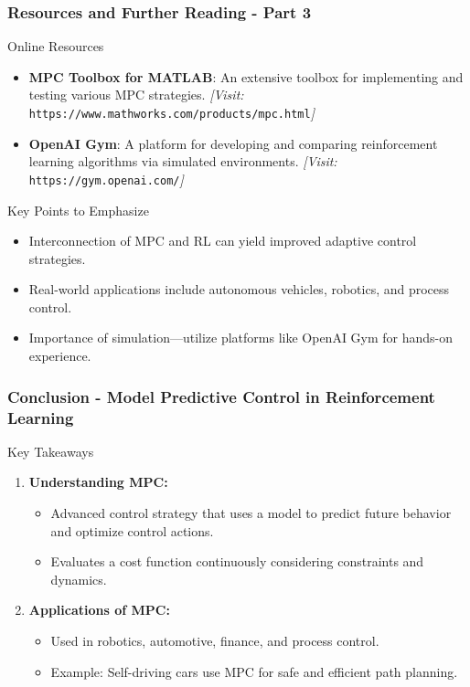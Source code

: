 \documentclass[aspectratio=169]{beamer}
\begin{document}
\begin{frame}[fragile]
    \frametitle{Resources and Further Reading - Part 3}
    
    \begin{block}{Online Resources}
        \begin{itemize}
            \item \textbf{MPC Toolbox for MATLAB}: An extensive toolbox for implementing and testing various MPC strategies. 
            \textit{[Visit:} \texttt{https://www.mathworks.com/products/mpc.html}\textit{]} 

            \item \textbf{OpenAI Gym}: A platform for developing and comparing reinforcement learning algorithms via simulated environments. 
            \textit{[Visit:} \texttt{https://gym.openai.com/}\textit{]} 
        \end{itemize}
    \end{block}

    \begin{block}{Key Points to Emphasize}
        \begin{itemize}
            \item Interconnection of MPC and RL can yield improved adaptive control strategies.
            \item Real-world applications include autonomous vehicles, robotics, and process control.
            \item Importance of simulation—utilize platforms like OpenAI Gym for hands-on experience.
        \end{itemize}
    \end{block}
\end{frame}

\begin{frame}[fragile]
    \frametitle{Conclusion - Model Predictive Control in Reinforcement Learning}
    \begin{block}{Key Takeaways}
        \begin{enumerate}
            \item \textbf{Understanding MPC:} 
                \begin{itemize}
                    \item Advanced control strategy that uses a model to predict future behavior and optimize control actions. 
                    \item Evaluates a cost function continuously considering constraints and dynamics.
                \end{itemize}
            \item \textbf{Applications of MPC:} 
                \begin{itemize}
                    \item Used in robotics, automotive, finance, and process control.
                    \item Example: Self-driving cars use MPC for safe and efficient path planning.
                \end{itemize}
        \end{enumerate}
    \end{block}
\end{frame}
\end{document}
